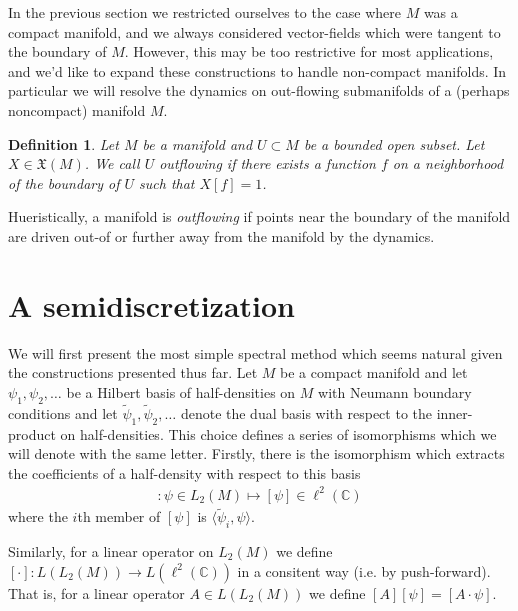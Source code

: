 \documentclass[12pt]{amsart}
\newtheorem{defn}{Definition}
\begin{document}
  In the previous section we restricted ourselves to the
case where $M$ was a compact manifold, and we always considered
vector-fields which were tangent to the boundary of $M$.
However, this may be too restrictive for most applications, and
we'd like to expand these constructions to handle non-compact
manifolds.
In particular we will resolve the dynamics on out-flowing
submanifolds of a (perhaps noncompact) manifold $M$.

\begin{defn}
  Let $M$ be a manifold and $U \subset M$ be a bounded open subset.
  Let $X \in \mathfrak{X}(M)$.
  We call $U$ outflowing if there exists a function $f$ on a neighborhood
  of the boundary of $U$ such that $X[f] = 1$.
\end{defn}

Hueristically, a manifold is \emph{outflowing} if points near the boundary
of the manifold are driven out-of or further away from the manifold by
the dynamics.

\section{A semidiscretization}
\label{sec:semi_discretization}

We will first present the most simple spectral method
which seems natural given the constructions presented thus far.
Let $M$ be a compact manifold and let
$\psi_1,\psi_2,\dots$ be a Hilbert basis of half-densities
on $M$ with Neumann boundary conditions
and let $\tilde{\psi}_1,\tilde{\psi}_2,\dots$ denote the dual basis
with respect to the inner-product on half-densities.
This choice defines a series of isomorphisms which we will
denote with the same letter.
Firstly, there is the isomorphism which extracts the coefficients of 
a half-density with respect to this basis
\begin{align*}
  [\cdot ] : \psi \in L_2(M) \mapsto [\psi] \in \ell^2( \mathbb{C})
\end{align*}
where the $i$th member of $[\psi]$ is $\langle \tilde{\psi}_i , \psi \rangle$.

Similarly, for a linear operator on $L_2(M)$ we define $[\cdot ]: L( L_2(M)) \to L( \ell^2( \mathbb{C}) )$ in a consitent way (i.e. by push-forward).  That is, for a linear operator $A \in L( L_2 (M))$ we define $[A] [\psi] = [A \cdot \psi]$. 
\end{document}

